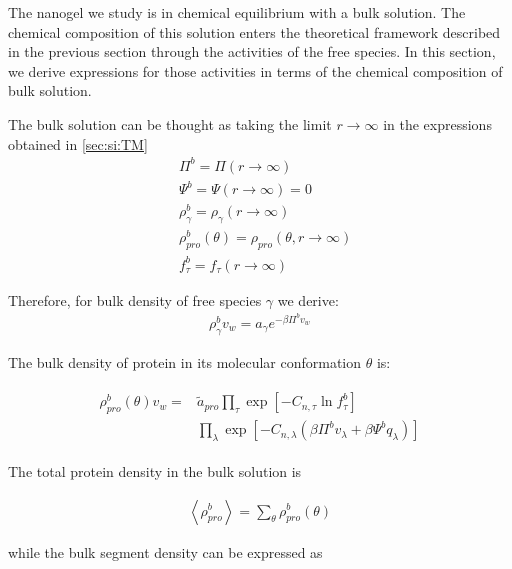 \documentclass[journal=jacsat,manuscript=suppinfo]{achemso}
\begin{document}
The nanogel we study is in chemical equilibrium with a bulk solution.
The chemical composition of this solution enters the theoretical framework described in the previous section through the activities of the free species. In this section, we derive expressions for those activities in terms of the chemical composition of bulk solution. 






The bulk solution can be thought as taking the limit $r \rightarrow \infty$ in the expressions obtained in \cref{sec:si:TM}
\begin{align}
	& \Pi^b = \Pi(r \rightarrow \infty) \\
	& \Psi^b=\Psi(r \rightarrow \infty) =  0 \\
	& \rho^b_\gamma =\rho_\gamma (r \rightarrow \infty)  \\
	& \rho^b_{pro}(\theta) = \rho_{pro}(\theta, r \rightarrow \infty) \\
	& f_\tau^b = f_\tau(r \rightarrow \infty)
\end{align}





Therefore, for bulk density of free species  $\gamma$ we derive:
\begin{align}
	\rho_\gamma^b v_w = a_\gamma e^{-\beta\Pi^bv_w}
	\label{si:eq:free-bulk}
\end{align}


The  bulk density  of protein in its molecular conformation $\theta$ is:

\begin{align}
	\begin{aligned}
		\rho^b_{pro}(\theta)v_w = &\tilde{a}_{pro} \prod_\tau\exp\left[-C_{n,\tau} \ln f^b_\tau\right] \\
		&\prod_\lambda \exp \left[-C_{n,\lambda} (\beta\Pi^b v_\lambda + \beta\Psi^b q_\lambda ) \right]    
	\end{aligned}
	\label{si:eq:bulk-protein}
\end{align}


The total protein density in the bulk solution is

\begin{align}
	\left<\rho^b_{pro}\right> = \sum_{\theta}\rho^b_{pro}(\theta) 
\end{align}

while the bulk segment density can be expressed as
\end{document}
